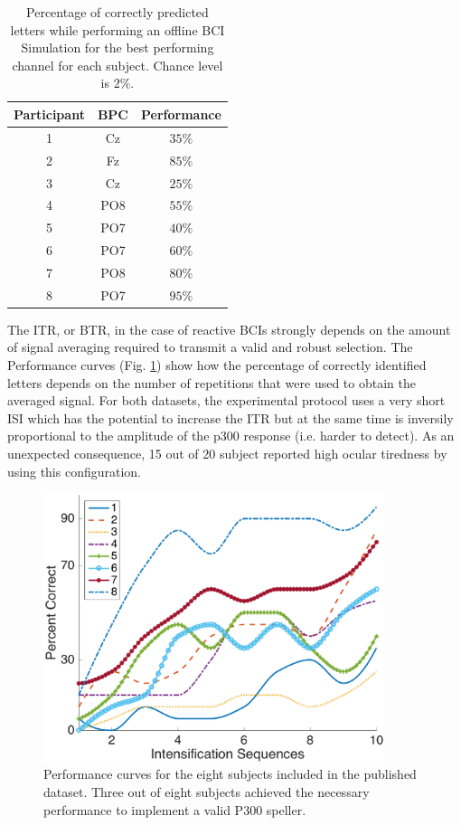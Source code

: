 \documentclass[entropy,article,submit,moreauthors,pdftex,10pt,a4paper]{mdpi}
\begin{document}
\begin{table}[H]
\caption{Percentage of correctly predicted letters while performing an offline BCI Simulation for the best performing channel for each subject. Chance level is $2\%$. }
\centering
\begin{tabular}{ccc}
\toprule
\textbf{Participant}	&  \textbf{BPC}	& \textbf{Performance}\\
\midrule
1     &     Cz   &   $35\%$  \\
2     &     Fz   &   $85\%$  \\
3     &     Cz   &   $25\%$  \\
4     &     PO8 &   $55\%$  \\
5     &     PO7 &   $40\%$ \\
6     &     PO7 &   $60\%$  \\
7     &     PO8 &   $80\%$  \\
8     &     PO7 &   $95\%$ \\

\bottomrule
\end{tabular}
\label{tab:results}
\end{table}

The ITR, or BTR, in the case of reactive BCIs \citep{WolpawJonathanR2012} strongly depends on the amount of signal averaging required to transmit a valid and robust selection.  The Performance curves (Fig. \ref{fig:performance}) show how the percentage of correctly identified letters depends on the number of repetitions that were used to obtain the averaged signal.
For both datasets, the experimental protocol uses a very short ISI which has the potential to increase the ITR but at the same time is inversily proportional to the amplitude of the p300 response (i.e. harder to detect).  As an unexpected consequence, 15 out of 20 subject reported high ocular tiredness by using this configuration.

\begin{figure}[H]
\centering
\includegraphics[width=10cm]{performance.eps}
\caption{Performance curves for the eight subjects included in the published dataset.  Three out of eight subjects achieved the necessary performance to implement a valid P300 speller.}
\label{fig:performance}
\end{figure}
\end{document}
